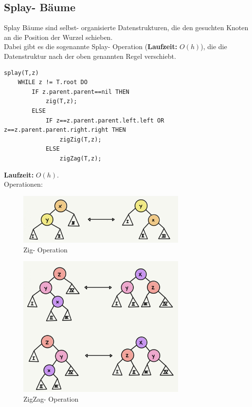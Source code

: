 \documentclass{article}
\begin{document}
        \subsection{Splay- Bäume}
            Splay Bäume sind selbst- organisierte Datenstrukturen, die den gesuchten Knoten an die Position der Wurzel schieben.\\
            Dabei gibt es die sogenannte Splay- Operation (\textbf{Laufzeit:} $O(h)$), die die Datenstruktur nach der oben genannten Regel verschiebt.
            \begin{lstlisting}[style=pseudocode]
splay(T,z)
    WHILE z != T.root DO
        IF z.parent.parent==nil THEN
            zig(T,z);
        ELSE
            IF z==z.parent.parent.left.left OR z==z.parent.parent.right.right THEN
                zigZig(T,z);
            ELSE
                zigZag(T,z);
            \end{lstlisting}
            \textbf{Laufzeit:} $O(h)$.\\
            Operationen:
            \begin{figure}[ht]
                \centering
                \includegraphics[width=0.75\textwidth]{Bilder/SplayZig.png}
                \caption{Zig- Operation}
                \label{fig:SplayBaeumeZig}
            \end{figure}
            \begin{figure}[ht]
                \centering
                \includegraphics[width=0.75\textwidth]{Bilder/SplayZigZag.png}
                \caption{ZigZag- Operation}
                \label{fig:SplayBaeumeZigZag}
            \end{figure}
\end{document}
